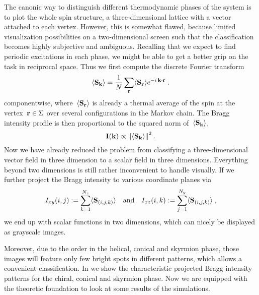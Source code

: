 The canonic way to distinguish different thermodynamic phases of the system is
to plot the whole spin structure, \ie{} a three-dimensional lattice with a
vector attached to each vertex. However, this is somewhat flawed, because
limited visualization possibilities on a two-dimensional screen such that the
classification becomes highly subjective and ambiguous. Recalling that we expect
to find periodic excitations in each phase, we might be able to get a better
grip on the task in reciprocal space. Thus we first compute the discrete Fourier
transform
%
\begin{equation}
  \langle \mathbf{S}_{\mathbf{k}} \rangle = \frac{1}{N} \sum_{\mathbf{r}} \langle \mathbf{S}_{\mathbf{r}} \rangle e^{- i\, \mathbf{k} \cdot \mathbf{r}}\:.
\end{equation}
%
componentwise, where~$\langle \mathbf{S}_{\mathbf{r}} \rangle$ is already a thermal average of the spin at
the vertex~$\mathbf{r} \in \Sigma$ over several configurations in the Markov chain. The
Bragg intensity profile is then proportional to the squared norm
of~$\langle \mathbf{S}_{\mathbf{k}} \rangle$,
%
\begin{equation}
  \mathbf{I}(\k) \propto \norm{\avg{\S_{\k}}}^2 \:.
\end{equation}
%
Now we have already reduced the problem from classifying a three-dimensional
vector field in three dimension to a scalar field in three dimensions.
Everything beyond two dimensions is still rather inconvenient to handle
visually. If we further project the Bragg intensity to various coordinate planes
via
%
\begin{equation}
  I_{xy} (i,j) := \sum_{k = 1}^{N_z} \langle \mathbf{S}_{(i,j,k)} \rangle \quad\text{and}\quad
  I_{xz} (i,k) := \sum_{j = 1}^{N_y} \langle \mathbf{S}_{(i,j,k)} \rangle\:,
\end{equation}
%
we end up with scalar functions in two dimensions, which can nicely be displayed
as grayscale images.

Moreover, due to the order in the helical, conical and skyrmion phase, those
images will feature only few bright spots in different patterns, which allows a
convenient classification. In  we show the
characteristic projected Bragg intensity patterns for the chiral, conical and
skyrmion phase. Now we are equipped with the theoretic foundation to look at
some results of the simulations.

\begin{figure}
  \centering
  \caption{\todo{}}
\label{fig:braggsample}
\end{figure}
